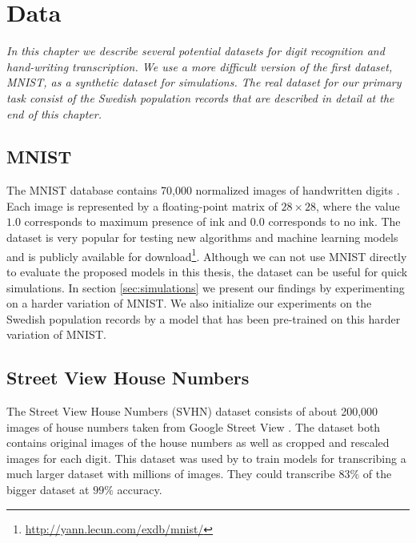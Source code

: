 \chapter{Data}

\textit{In this chapter we describe several potential datasets for digit recognition and hand-writing transcription. We use a more difficult version of the first dataset, MNIST, as a synthetic dataset for simulations. The real dataset for our primary task consist of the Swedish population records that are described in detail at the end of this chapter.}


\section{MNIST}

The MNIST database contains 70,000 normalized images of handwritten digits \cite{MNIST_orig}.
Each image is represented by a floating-point matrix of $28 \times 28$, where the value $1.0$ corresponds to maximum presence of ink and $0.0$ corresponds to no ink.
The dataset is very popular for testing new algorithms and machine learning models \cite{MNIST} and is publicly available for download\footnote{\url{http://yann.lecun.com/exdb/mnist/}}.
Although we can not use MNIST directly to evaluate the proposed models in this thesis, the dataset can be useful for quick simulations.
In section \ref{sec:simulations} we present our findings by experimenting on a harder variation of MNIST.
We also initialize our experiments on the Swedish population records by a model that has been pre-trained on this harder variation of MNIST.

\section{Street View House Numbers}

The Street View House Numbers (SVHN) dataset consists of about 200,000 images of house numbers taken from Google Street View \cite{SVHN}. The dataset both contains original images of the house numbers as well as cropped and rescaled images for each digit. This dataset was used by \textcite{multidigit_streetview} to train models for transcribing a much larger dataset with millions of images. They could transcribe $83\%$ of the bigger dataset at $99\%$ accuracy.

